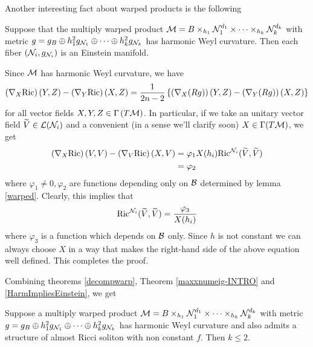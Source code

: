         Another interesting fact about warped products is the following
        \begin{teorema}\label{HarmImpliesEinstein}
            Suppose that the multiply warped product $\mathcal{M} = B \times_{h_1} \mathcal{N}_1^{d_1} \times \cdots \times_{h_k} \mathcal{N}_{k}^{d_k}$ with metric $g = g_{B} \oplus h_1^2 g_{\mathcal{N}_1} \oplus \cdots \oplus h_{k}^2 g_{\mathcal{N}_k}$ has harmonic Weyl curvature. Then each fiber $\left(\mathcal{N}_i, g_{\mathcal{N}_i}\right)$ is an Einstein manifold.
        \end{teorema}
        
        \begin{demm}
        Since $\mathcal{M}$ has harmonic Weyl curvature, we have
        \begin{equation}\label{CotN}
            \left(\nabla_X \mathrm{Ric}\right)(Y, Z) -  \left(\nabla_Y \mathrm{Ric}\right)(X, Z) = \frac{1}{2n-2} \left\{\left(\nabla_X (Rg)\right)(Y, Z) - \left(\nabla_Y (Rg)\right)(X, Z)\right\}
        \end{equation}
            for all vector fields $ X, Y, Z \in \Gamma\left(T \mathcal{M}\right)$. In particular, if we take an unitary vector field $\widetilde{V} \in \mathcal{L}(\mathcal{N}_i)$ and a convenient (in a sense we'll clarify soon) $X \in \Gamma(T \mathcal{M})$, we get 
            \begin{align*}
                \left(\nabla_X \mathrm{Ric}\right)(V, V) -  \left(\nabla_V \mathrm{Ric}\right)(X, V) &= \varphi_1 X(h_i) \mathrm{Ric}^{\mathcal{N}_i}(\widetilde{V}, \widetilde{V})\\
                &=\varphi_2
            \end{align*}
            where $\varphi_1 \neq 0, \varphi_2$ are functions depending only on $\mathcal{B}$ determined by lemma \cref{warped}. Clearly, this implies that
            \[
                \mathrm{Ric}^{\mathcal{N}_i}(\widetilde{V}, \widetilde{V}) = \frac{\varphi_3}{X(h_i)} 
                \]
            where $\varphi_3$ is a function which depends on $\mathcal{B}$ only. Since $h$ is not constant we can always choose $X$ in a way that makes the right-hand side of the above equation well defined. This completes the proof.
        \end{demm}	
        
        Combining theorems \cref{decompwarp}, Theorem \cref{maxxnumeig-INTRO} and \cref{HarmImpliesEinstein}, we get \\
        \begin{teorema}
            Suppose a multiply warped product $\mathcal{M} = B \times_{h_1} \mathcal{N}_1^{d_1} \times \cdots \times_{h_k} \mathcal{N}_{k}^{d_k}$ with metric $g = g_{B} \oplus h_1^2 g_{\mathcal{N}_1} \oplus \cdots \oplus h_{k}^2 g_{\mathcal{N}_k}$ has harmonic Weyl curvature and also admits a structure of almost Ricci soliton with non constant $f$. Then $k \leq 2$. \\
        \end{teorema}
        
